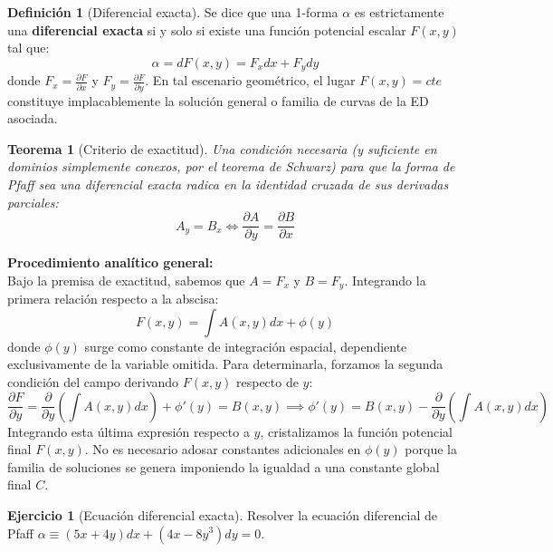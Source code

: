 \documentclass[11pt,a4paper]{article}
\theoremstyle{definition}
\newtheorem{definition}{Definición}[section]
\newtheorem{exercise}{Ejercicio}[section]
\theoremstyle{plain}
\newtheorem{theorem}{Teorema}[section]
\begin{document}
\begin{definition}[Diferencial exacta]
Se dice que una 1-forma $\alpha$ es estrictamente una \textbf{diferencial exacta} si y solo si existe una función potencial escalar $F(x,y)$ tal que:
$$ \alpha = dF(x,y) = F_x dx + F_y dy $$
donde $F_x = \frac{\partial F}{\partial x}$ y $F_y = \frac{\partial F}{\partial y}$. En tal escenario geométrico, el lugar $F(x,y) = cte$ constituye implacablemente la solución general o familia de curvas de la ED asociada.
\end{definition}

\begin{theorem}[Criterio de exactitud]
Una condición necesaria (y suficiente en dominios simplemente conexos, por el teorema de Schwarz) para que la forma de Pfaff sea una diferencial exacta radica en la identidad cruzada de sus derivadas parciales:
$$ A_y = B_x \iff \frac{\partial A}{\partial y} = \frac{\partial B}{\partial x} $$
\end{theorem}

\textbf{Procedimiento analítico general:} \\
Bajo la premisa de exactitud, sabemos que $A = F_x$ y $B = F_y$. 
Integrando la primera relación respecto a la abscisa:
$$ F(x,y) = \int A(x,y)dx + \phi(y) $$
donde $\phi(y)$ surge como constante de integración espacial, dependiente exclusivamente de la variable omitida. Para determinarla, forzamos la segunda condición del campo derivando $F(x,y)$ respecto de $y$:
$$ \frac{\partial F}{\partial y} = \frac{\partial}{\partial y} \left( \int A(x,y)dx \right) + \phi'(y) = B(x,y) \implies \phi'(y) = B(x,y) - \frac{\partial}{\partial y} \left( \int A(x,y)dx \right) $$
Integrando esta última expresión respecto a $y$, cristalizamos la función potencial final $F(x,y)$. No es necesario adosar constantes adicionales en $\phi(y)$ porque la familia de soluciones se genera imponiendo la igualdad a una constante global final $C$.

\begin{exercise}[Ecuación diferencial exacta]
Resolver la ecuación diferencial de Pfaff $\alpha \equiv (5x + 4y)dx + (4x - 8y^3)dy = 0$.
\end{exercise}
\end{document}
